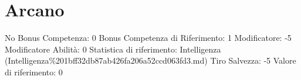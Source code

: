 \section{Arcano}\label{arcano}

\begin{description}
\tightlist
\item[Tags: ABI]
No Bonus Competenza: 0 Bonus Competenza di Riferimento: 1 Modificatore:
-5 Modificatore Abilità: 0 Statistica di riferimento: Intelligenza
(Intelligenza\%201bff32db87ab426fa206a52ccd063fd3.md) Tiro Salvezza: -5
Valore di riferimento: 0
\end{description}
